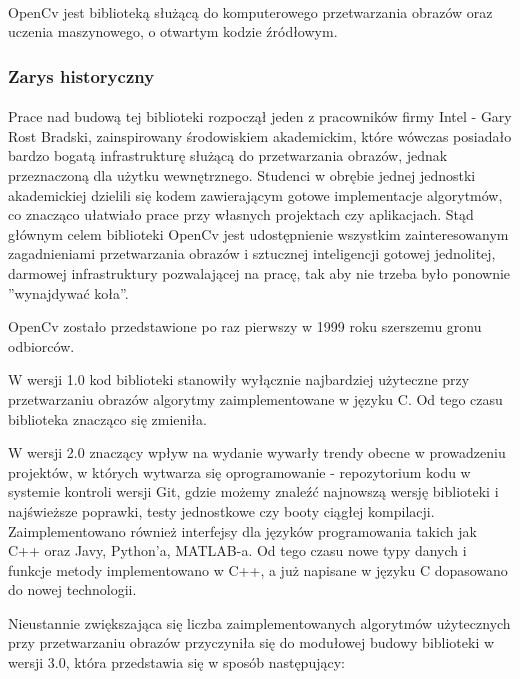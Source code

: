 \documentclass[a4paper,12pt]{article}
\begin{document}
			\paragraph{\indent} 
				OpenCv jest biblioteką służącą do komputerowego przetwarzania obrazów oraz uczenia maszynowego, o otwartym kodzie źródłowym.
		\subsubsection{Zarys historyczny}
			\paragraph{\indent}  Prace nad budową tej biblioteki rozpoczął jeden z        pracowników firmy Intel - Gary Rost Bradski, zainspirowany środowiskiem     akademickim, które wówczas posiadało bardzo bogatą                          infrastrukturę służącą do przetwarzania obrazów, jednak                     przeznaczoną dla użytku wewnętrznego. Studenci w obrębie jednej             jednostki akademickiej dzielili się kodem zawierającym gotowe               implementacje algorytmów, co znacząco ułatwiało prace przy własnych         projektach czy aplikacjach. 
				Stąd głównym celem biblioteki OpenCv jest udostępnienie wszystkim zainteresowanym zagadnieniami przetwarzania obrazów i sztucznej inteligencji gotowej jednolitej, darmowej infrastruktury pozwalającej na pracę, tak aby nie trzeba było ponownie ''wynajdywać koła''.\par
				OpenCv zostało przedstawione po raz pierwszy w 1999 roku szerszemu gronu odbiorców. \par  
                 W wersji 1.0 kod biblioteki stanowiły wyłącznie najbardziej użyteczne przy przetwarzaniu obrazów
				algorytmy zaimplementowane w języku C. 
				Od tego czasu biblioteka znacząco się zmieniła. \par
			    W wersji 2.0 znaczący wpływ na wydanie wywarły trendy obecne w prowadzeniu projektów, w których wytwarza się oprogramowanie - repozytorium kodu w systemie kontroli wersji Git, gdzie możemy znaleźć najnowszą wersję biblioteki i najświeższe poprawki, testy jednostkowe czy booty ciągłej kompilacji. 
				Zaimplementowano również interfejsy dla języków programowania takich jak C++ oraz Javy, Python’a, MATLAB-a.
				Od tego czasu nowe typy danych i funkcje metody implementowano w C++, a już napisane w języku C dopasowano do nowej technologii. \par
				Nieustannie zwiększająca się liczba zaimplementowanych algorytmów użytecznych przy przetwarzaniu obrazów przyczyniła się do modułowej budowy biblioteki w wersji 3.0, która przedstawia się w sposób następujący:
                
\end{document}
